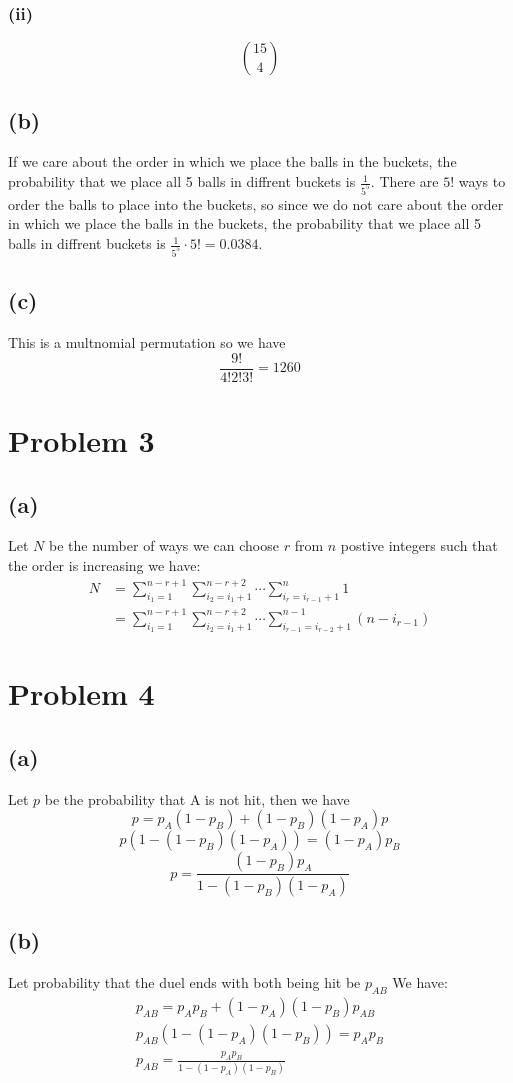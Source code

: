 \subsubsection*{(ii)}
$$\boxed{15 \choose 4}$$
\subsection*{(b)}
If we care about the order in which we place the balls in the buckets, the probability that we place all 5 balls in diffrent buckets is $\frac{1}{5^5}$.
There are $5!$ ways to order the balls to place into the buckets, so since we do not care about
the order in which we place the balls in the buckets, the probability that we place all 5 balls in diffrent buckets is $\frac{1}{5^5}\cdot5!=0.0384
$.
\subsection*{(c)}
This is a multnomial permutation so we have
$$\frac{9!}{4!2!3!}=\boxed{1260}$$

\section*{Problem 3}
\subsection*{(a)}
Let $N$ be the number of ways we can choose $r$ from $n$ postive integers 
such that the order is increasing we have:
\begin{align*}
    N&=\sum_{i_1=1}^{n-r+1}\sum_{i_2=i_1+1}^{n-r+2}\cdots\sum_{i_r=i_{r-1}+1}^{n}1\\
    &=\sum_{i_1=1}^{n-r+1}\sum_{i_2=i_1+1}^{n-r+2}\cdots\sum_{i_{r-1}=i_{r-2}+1}^{n-1}(n-i_{r-1})
\end{align*}
\section*{Problem 4}
\subsection*{(a)}
Let $p$ be the probability that A is not hit, then we have
$$p=p_A(1-p_B)+(1-p_B)(1-p_A)p$$
$$p(1-(1-p_B)(1-p_A))=(1-p_A)p_B$$
$$p=\boxed{\frac{(1-p_B)p_A}{1-(1-p_B)(1-p_A)}}$$
\subsection*{(b)}
Let probability that the duel ends with both being hit be $p_{AB}$
We have:
\begin{align*}
    p_{AB}=p_Ap_B+(1-p_A)(1-p_B)p_{AB}\\
    p_{AB}\left(1-(1-p_A)(1-p_B)\right)=p_Ap_B\\
    p_{AB}=\boxed{\frac{p_Ap_B}{1-(1-p_A)(1-p_B)}}
\end{align*}
